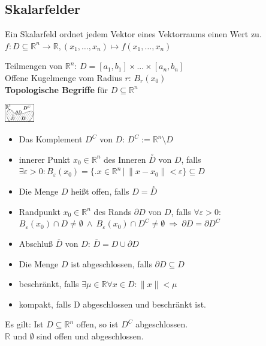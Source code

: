\documentclass[6pt,a4paper]{scrartcl}
\newcommand{\iset}[2]{\ensuremath{\bigl\{ \bigl. #1 \, \bigr| \, #2 \bigr\}}}					%
\newcommand{\norm}[1]{\ensuremath{\|#1\|}}														%
\renewcommand{\emph}[1]{\textbf{#1}}															%
\newcommand{\ol}[1]{\ensuremath{\overline{#1}}}									%
\newcommand{\R}{\ensuremath{\mathbb R}}
\begin{document}
\begin{multicols}{4}
\section{Skalarfelder}
Ein Skalarfeld ordnet jedem Vektor eines Vektorraums einen Wert zu.\\
$ f:D\subseteq \mathbb R^n \rightarrow \mathbb R, (x_1,\ldots ,x_n) \mapsto f(x_1,\ldots ,x_n) $
\parbox{5.5cm}{
Teilmengen von $\mathbb R^n$: $D = [a_1,b_1] \times ... \times [a_n,b_n]$\\
Offene Kugelmenge vom Radius $r$: $B_r(x_0)$\\
\emph{Topologische Begriffe} für $D \subseteq \mathbb R^n$ } \parbox{1.0cm}{ \includegraphics[height=0.8cm]{img/topologie.pdf} }
\begin{itemize}\itemsep-1pt
	\item Das Komplement $D^C$ von $D$: $D^C := \R^n \setminus D$
	\item innerer Punkt $x_0 \in \mathbb R^n$ des Inneren $\overset{\circ}{D}$ von $D$, falls \\
		$\exists \varepsilon > 0: B_\varepsilon (x_0) = \iset{x\in \mathbb R^n}{\norm{x-x_0} < \varepsilon} \subseteq D$
	\item Die Menge $D$ heißt offen, falls $D=\overset{\circ}{D}$
	\item Randpunkt $x_0 \in \mathbb R^n$ des Rands $\partial D$ von $D$, falls $\forall \varepsilon > 0:$ \\ 
		$B_\varepsilon(x_0) \cap D \ne \emptyset \ \land \ B_\varepsilon(x_0) \cap D^C \ne \emptyset \ \Rightarrow \ \partial D = \partial D^C$
	\item Abschluß $\ol D$ von $D$: $\overline{D}=D \cup \partial D$
	\item Die Menge $D$ ist abgeschlossen, falls $\partial D \subseteq D$
	\item beschränkt, falls $\exists \mu \in \mathbb R \forall x \in D: \norm{x} < \mu$
	\item kompakt, falls D abgeschlossen und beschränkt ist. 
\end{itemize}
Es gilt: Ist $D \subseteq \mathbb R^n$ offen, so ist $D^C$ abgeschlossen. \\
$\mathbb R$ und $\emptyset$ sind offen und abgeschlossen.





\end{multicols}
\end{document}
